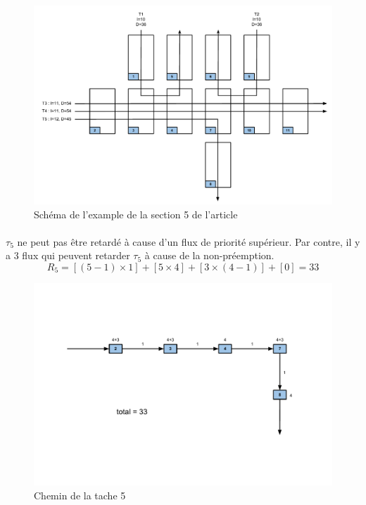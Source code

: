 \documentclass[10pt,a4paper]{article}
\newenvironment{figureH} {%
\begin{figure}[H]
}{%
\end{figure}
}
\begin{document}
\begin{figureH}
  \includegraphics[width=\textwidth]{images/global.pdf}
  \center
  \caption{Schéma de l'example de la section 5 de l'article}
  \label{image_global}
\end{figureH}

\paragraph{}
$\tau_5$ ne peut pas être retardé à cause d'un flux de priorité supérieur. Par contre, il y a 3 flux qui peuvent retarder $\tau_5$ à cause de la non-préemption.
\[ R_{5} = [(5-1) \times 1]  + [5 \times 4] + [3 \times (4-1)] + [0] = 33 \]

\begin{figureH}
  \includegraphics[width=\textwidth]{images/tache5.pdf}
  \center
  \caption{Chemin de la tache 5}
  \label{image_global}
\end{figureH}
\end{document}
